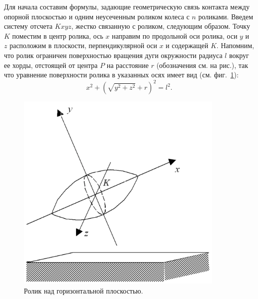 
\label{sec3}
Для начала составим формулы, задающие геометрическую связь контакта между опорной плоскостью и одним неусеченным роликом колеса с $n$ роликами. Введем систему отсчета $Kxyz$, жестко связанную с роликом, следующим образом. Точку $K$ поместим в центр ролика, ось $x$ направим по продольной оси ролика, оси $y$ и $z$ расположим в плоскости, перпендикулярной оси $x$ и содержащей $K$. Напомним, что ролик ограничен поверхностью вращения дуги окружности радиуса $l$ вокруг ее хорды, отстоящей от центра $P$ на расстояние $r$ (обозначения см. на рис.), так что уравнение поверхности ролика в указанных осях имеет вид (см. фиг.~\ref{Roller}):
\begin{equation}
    x^2 + \left( \sqrt{ y^2 + z^2 } + r \right)^2 = l^2.
\end{equation}

\begin{figure}[htb]
    \centering
    \includegraphics[width=10cm]{content/pic/modelica/Roller.png}
    \caption{Ролик над горизонтальной плоскостью.}
    \label{Roller}
\end{figure}


